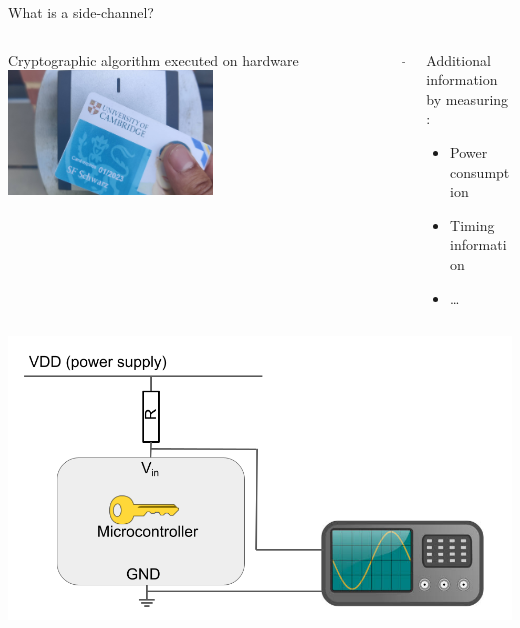 \begin{frame}[fragile]{What is a side-channel?}
    \vspace{-1em}
    \begin{columns}
        \begin{column}{0.45\textwidth}
            \begin{center}
                Cryptographic algorithm executed on hardware \\
                \vspace{0.5em}
                \includegraphics[width=0.55\textwidth]{res/cardopen.png}
            \end{center}
        \end{column}
        \begin{column}{0.1\textwidth}
            \centering
            {\LARGE +}
        \end{column}
        \begin{column}{0.45\textwidth}
            \centering
            Additional information by measuring :
            \begin{itemize}
                \item Power consumption
                \item Timing information
                \item \ldots
            \end{itemize}
        \end{column}
    \end{columns}

    \begin{center}
        \includegraphics[width=0.7\linewidth]{res/osci1.png}
    \end{center}

\end{frame}

